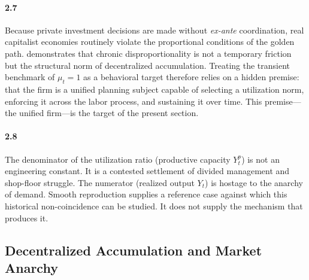 \paragraph{2.7} Because private investment decisions are made without
\textit{ex-ante} coordination, real capitalist economies
routinely violate the proportional conditions of the golden path.
\citet{Okishio2022} demonstrates that chronic disproportionality
is not a temporary friction but the structural norm of
decentralized accumulation. Treating the transient benchmark of
$\mu_t = 1$ as a behavioral target therefore relies on a hidden
premise: that the firm is a unified planning subject capable of
selecting a utilization norm, enforcing it across the labor
process, and sustaining it over time. This premise---the unified
firm---is the target of the present section.

\paragraph{2.8} The denominator of the utilization ratio (productive capacity
$Y^p_t$) is not an engineering constant. It is a contested
settlement of divided management and shop-floor struggle. The
numerator (realized output $Y_t$) is hostage to the anarchy of
demand. Smooth reproduction supplies a reference case against
which this historical non-coincidence can be studied. It does not
supply the mechanism that produces it.

\subsection{Decentralized Accumulation and Market Anarchy}

